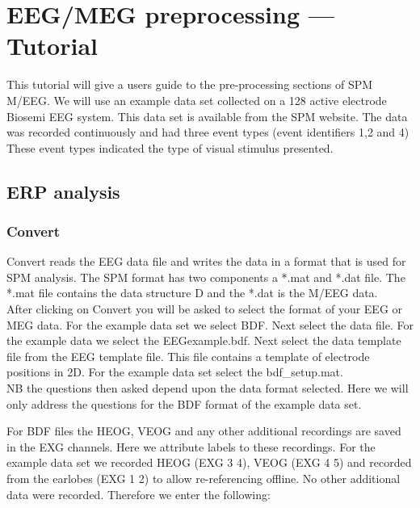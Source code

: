 \chapter{EEG/MEG preprocessing --- Tutorial \label{Chap:eeg:tutorial}}

This tutorial will give a users guide to the pre-processing sections
of SPM M/EEG. We will use an example data set collected on a 128 active
electrode Biosemi EEG system. This data set is available from the SPM
website. The data was recorded continuously and had three event types
(event identifiers 1,2 and 4) These event types indicated the type of
visual stimulus presented.

\section{ERP analysis}

\subsection{Convert}
Convert reads the EEG data file and writes the data in a format that
is used for SPM analysis. The SPM format has two components a *.mat
and *.dat file. The *.mat file contains the data structure D and the
*.dat is the M/EEG data.\\

After clicking on Convert you will be asked to select the format of
your EEG or MEG data. For the example data set we select BDF. Next
select the data file. For the example data we select the
EEGexample.bdf. Next select the data template file from the EEG
template file. This file contains a template of electrode positions in
2D. For the example data set select the bdf\_setup.mat.\\

NB the questions then asked depend upon the data format selected. Here
we will only address the questions for the BDF format of the example
data set. 

For BDF files the HEOG, VEOG and any other additional recordings are
saved in the EXG channels. Here we attribute labels to these
recordings. For the example data set we recorded HEOG (EXG 3 4), VEOG
(EXG 4 5) and recorded from the earlobes (EXG 1 2) to allow
re-referencing offline. No other additional data were
recorded. Therefore we enter the following:

